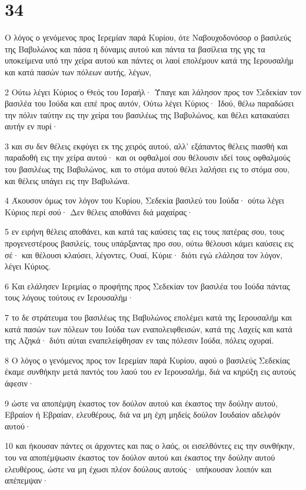 \chapter{34}

\par Ο λόγος ο γενόμενος προς Ιερεμίαν παρά Κυρίου, ότε Ναβουχοδονόσορ ο βασιλεύς της Βαβυλώνος και πάσα η δύναμις αυτού και πάντα τα βασίλεια της γης τα υποκείμενα υπό την χείρα αυτού και πάντες οι λαοί επολέμουν κατά της Ιερουσαλήμ και κατά πασών των πόλεων αυτής, λέγων,
\par 2 Ούτω λέγει Κύριος ο Θεός του Ισραήλ· Ύπαγε και λάλησον προς τον Σεδεκίαν τον βασιλέα του Ιούδα και ειπέ προς αυτόν, Ούτω λέγει Κύριος· Ιδού, θέλω παραδώσει την πόλιν ταύτην εις την χείρα του βασιλέως της Βαβυλώνος, και θέλει κατακαύσει αυτήν εν πυρί·
\par 3 και συ δεν θέλεις εκφύγει εκ της χειρός αυτού, αλλ' εξάπαντος θέλεις πιασθή και παραδοθή εις την χείρα αυτού· και οι οφθαλμοί σου θέλουσιν ιδεί τους οφθαλμούς του βασιλέως της Βαβυλώνος, και το στόμα αυτού θέλει λαλήσει εις το στόμα σου, και θέλεις υπάγει εις την Βαβυλώνα.
\par 4 Άκουσον όμως τον λόγον του Κυρίου, Σεδεκία βασιλεύ του Ιούδα· ούτω λέγει Κύριος περί σού· Δεν θέλεις αποθάνει διά μαχαίρας·
\par 5 εν ειρήνη θέλεις αποθάνει, και κατά τας καύσεις τας εις τους πατέρας σου, τους προγενεστέρους βασιλείς, τους υπάρξαντας προ σου, ούτω θέλουσι κάμει καύσεις εις σέ· και θέλουσι κλαύσει, λέγοντες, Ουαί, Κύριε· διότι εγώ ελάλησα τον λόγον, λέγει Κύριος.
\par 6 Και ελάλησεν Ιερεμίας ο προφήτης προς Σεδεκίαν τον βασιλέα του Ιούδα πάντας τους λόγους τούτους εν Ιερουσαλήμ·
\par 7 το δε στράτευμα του βασιλέως της Βαβυλώνος επολέμει κατά της Ιερουσαλήμ και κατά πασών των πόλεων του Ιούδα των εναπολειφθεισών, κατά της Λαχείς και κατά της Αζηκά· διότι αύται εναπελείφθησαν εν ταις πόλεσιν Ιούδα, πόλεις οχυραί.
\par 8 Ο λόγος ο γενόμενος προς τον Ιερεμίαν παρά Κυρίου, αφού ο βασιλεύς Σεδεκίας έκαμε συνθήκην μετά παντός του λαού του εν Ιερουσαλήμ, διά να κηρύξη εις αυτούς άφεσιν·
\par 9 ώστε να αποπέμψη έκαστος τον δούλον αυτού και έκαστος την δούλην αυτού, Εβραίον ή Εβραίαν, ελευθέρους, διά να μη έχη μηδείς δούλον Ιουδαίον αδελφόν αυτού·
\par 10 και ήκουσαν πάντες οι άρχοντες και πας ο λαός, οι εισελθόντες εις την συνθήκην, του να αποπέμψωσιν έκαστος τον δούλον αυτού και έκαστος την δούλην αυτού ελευθέρους, ώστε να μη έχωσι πλέον δούλους αυτούς· υπήκουσαν λοιπόν και απέπεμψαν·
